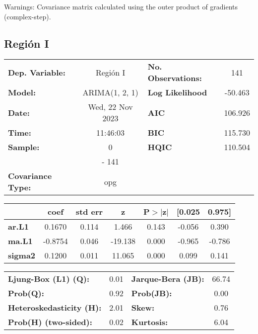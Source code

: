 \documentclass{article}%
\begin{document}
Warnings: \newline
 [1] Covariance matrix calculated using the outer product of gradients (complex-step).%
\subsection*{Región I}%
\begin{center}
\begin{tabular}{lclc}
\toprule
\textbf{Dep. Variable:}          &     Región I     & \textbf{  No. Observations:  } &    141      \\
\textbf{Model:}                  &  ARIMA(1, 2, 1)  & \textbf{  Log Likelihood     } &  -50.463    \\
\textbf{Date:}                   & Wed, 22 Nov 2023 & \textbf{  AIC                } &  106.926    \\
\textbf{Time:}                   &     11:46:03     & \textbf{  BIC                } &  115.730    \\
\textbf{Sample:}                 &        0         & \textbf{  HQIC               } &  110.504    \\
\textbf{}                        &       - 141      & \textbf{                     } &             \\
\textbf{Covariance Type:}        &       opg        & \textbf{                     } &             \\
\bottomrule
\end{tabular}
\begin{tabular}{lcccccc}
                & \textbf{coef} & \textbf{std err} & \textbf{z} & \textbf{P$> |$z$|$} & \textbf{[0.025} & \textbf{0.975]}  \\
\midrule
\textbf{ar.L1}  &       0.1670  &        0.114     &     1.466  &         0.143        &       -0.056    &        0.390     \\
\textbf{ma.L1}  &      -0.8754  &        0.046     &   -19.138  &         0.000        &       -0.965    &       -0.786     \\
\textbf{sigma2} &       0.1200  &        0.011     &    11.065  &         0.000        &        0.099    &        0.141     \\
\bottomrule
\end{tabular}
\begin{tabular}{lclc}
\textbf{Ljung-Box (L1) (Q):}     & 0.01 & \textbf{  Jarque-Bera (JB):  } & 66.74  \\
\textbf{Prob(Q):}                & 0.92 & \textbf{  Prob(JB):          } &  0.00  \\
\textbf{Heteroskedasticity (H):} & 2.01 & \textbf{  Skew:              } &  0.76  \\
\textbf{Prob(H) (two-sided):}    & 0.02 & \textbf{  Kurtosis:          } &  6.04  \\
\bottomrule
\end{tabular}
\end{center}
\end{document}
